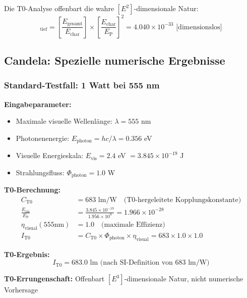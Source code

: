 \documentclass[12pt,a4paper]{article}
\newcommand{\EP}{E_{\text{P}}}
\newcommand{\Echar}{E_{\text{char}}}
\newcommand{\Evis}{E_{\text{vis}}}
\newcommand{\Cto}{C_{\text{T0}}}
\newcommand{\etavis}{\eta_{\text{visual}}}
\newcommand{\Phiphoton}{\Phi_{\text{photon}}}
\begin{document}
	Die T0-Analyse offenbart die wahre $[E^2]$-dimensionale Natur:
	\begin{equation}
		[n_{\text{T0}}]_{\text{tief}} = \left[\frac{E_{\text{gesamt}}}{\Echar}\right] \times \left[\frac{\Echar}{\EP}\right]^2 = 4.040 \times 10^{-33} \text{ [dimensionslos]}
		\label{eq:mol_e2_dimension}
	\end{equation}
	
	\subsection{Candela: Spezielle numerische Ergebnisse}
	\label{subsec:candela_numerische_ergebnisse}
	
	\subsubsection{Standard-Testfall: 1 Watt bei 555 nm}
	\label{subsubsec:candela_555nm_test}
	
	\textbf{Eingabeparameter:}
	\begin{itemize}
		\item Maximale visuelle Wellenlänge: $\lambda = 555$ nm
		\item Photonenenergie: $E_{\text{photon}} = hc/\lambda = 0.356$ eV
		\item Visuelle Energieskala: $\Evis = 2.4$ eV $= 3.845 \times 10^{-19}$ J
		\item Strahlungsfluss: $\Phiphoton = 1.0$ W
	\end{itemize}
	
	\textbf{T0-Berechnung:}
	\begin{align}
		\Cto &= 683 \text{ lm/W} \quad \text{(T0-hergeleitete Kopplungskonstante)} \\
		\frac{\Evis}{\EP} &= \frac{3.845 \times 10^{-19}}{1.956 \times 10^{9}} = 1.966 \times 10^{-28} \\
		\etavis(555\text{nm}) &= 1.0 \quad \text{(maximale Effizienz)} \\
		I_{\text{T0}} &= \Cto \times \Phiphoton \times \etavis = 683 \times 1.0 \times 1.0
	\end{align}
	
	\textbf{T0-Ergebnis:}
	\begin{equation}
		\boxed{I_{\text{T0}} = 683.0 \text{ lm (nach SI-Definition von 683 lm/W)}}
		\label{eq:candela_t0_ergebnis}
	\end{equation}
	
	\textbf{T0-Errungenschaft:} Offenbart $[E^3]$-dimensionale Natur, nicht numerische Vorhersage
	
\end{document}
